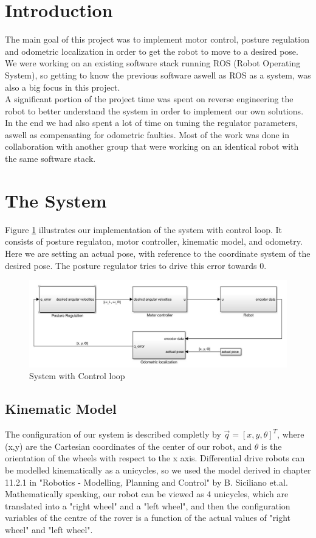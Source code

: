 \documentclass[a4paper,10pt]{article}
\begin{document}
\section{Introduction}
The main goal of this project was to implement motor control, posture regulation and odometric localization in order to get the robot to move to a desired pose. 
We were working on an existing software stack running ROS (Robot Operating System), so getting to know the previous software aswell as ROS as a system, 
was also a big focus in this project.\\
A significant portion of the project time was spent on reverse engineering the robot to better understand the system in order to implement our own solutions. 
In the end we had also spent a lot of time on tuning the regulator parameters, aswell as compensating for odometric faulties. 
Most of the work was done in collaboration with another group that were working on an identical robot with the same software stack. \\

\section{The System}
Figure \ref{fig:blockdiagram} illustrates our implementation of the system with control loop. It consists of posture regulaton, motor controller, 
kinematic model, and odometry. Here we are setting an actual pose, with reference to the coordinate system of the desired pose. 
The posture regulator tries to drive this error towards 0.

	\begin{figure}[H]
	\centering
	\includegraphics[width=1\textwidth]{blokkskjema.JPG}
	\caption{System with Control loop}	
 	\label{fig:blockdiagram}
	\end{figure}

\subsection{Kinematic Model}
The configuration of our system is described completly by $\vec{q} = [x, y, \theta]^T$, where (x,y) are the Cartesian coordinates of the center of our robot, 
and $\theta$ is the orientation of the wheels with respect to the x axis. 
Differential drive robots can be modelled kinematically as a unicycles, so we used the model derived in chapter 11.2.1 in "Robotics - Modelling, Planning and Control" by B. Siciliano et.al. 
Mathematically speaking, our robot can be viewed as 4 unicycles, which are translated into a "right wheel" and a "left wheel", 
and then the configuration variables of the centre of the rover is a function of the actual values of "right wheel" and "left wheel".
\end{document}
